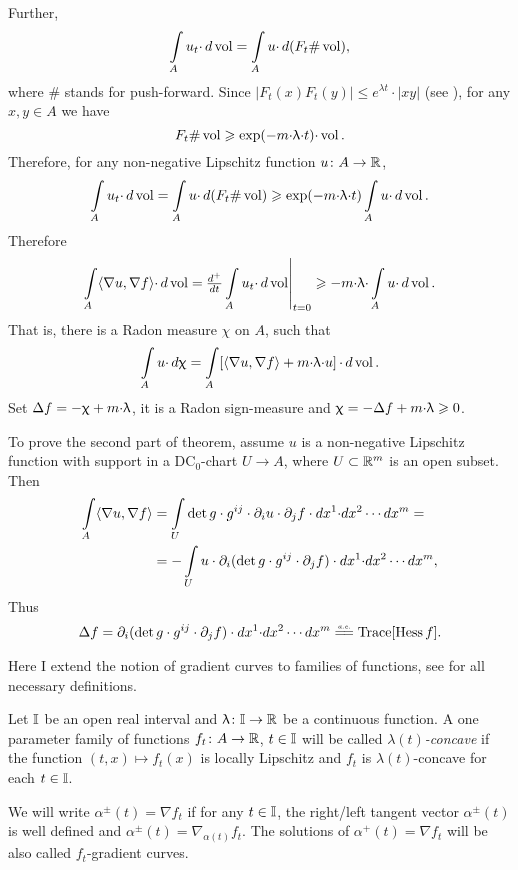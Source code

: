 \documentclass[oneside,a4paper]{article}
\begin{document}
Further,
$$\int\limits_A u_t{\cdot} \,d\mathop{\rm vol}\nolimits=\int\limits_A u{\cdot} \,d(F_t\#\mathop{\rm vol}\nolimits),$$ 
where $\#$ stands for push-forward. 
Since $|F_t(x)F_t(y)|\le e^{\lambda t}{\cdot}|x y|$  
(see \cite[2.1.4(i)]{petrunin:survey}), 
for any $x,y\in A$ we have
$$F_t\#\mathop{\rm vol}\nolimits\geqslant \exp(-m{\cdot}\uplambda{\cdot} t){\cdot}\mathop{\rm vol}\nolimits.$$
Therefore, for any non-negative Lipschitz function $u\colon A\to\mathbb{R}$,
$$\int\limits_A u_t{\cdot}\,d\mathop{\rm vol}\nolimits
=
\int\limits_A u{\cdot}\,d (F_t\#\mathop{\rm vol}\nolimits)
\geqslant
\exp(-m{\cdot}\uplambda{\cdot} t)\int\limits_A u{\cdot}\,d\mathop{\rm vol}\nolimits.$$
Therefore
$$\int\limits_A\langle\nabla u,\nabla f\rangle{\cdot}\,d\mathop{\rm vol}\nolimits 
=
\!\left.\tfrac{d^+}{d t}\int\limits_A u_t{\cdot}\,d\mathop{\rm vol}\nolimits\right|_{t=0}
\geqslant
-m{\cdot}\uplambda{\cdot}\int\limits_A u{\cdot}\,d\mathop{\rm vol}\nolimits.$$
That is, there is a Radon measure $\chi$ on $A$, such that
$$\int\limits_A u{\cdot}\,d\upchi
=
\int\limits_A\!\left[\langle\nabla u,\nabla f\rangle+m{\cdot}\uplambda{\cdot} u\right]{\cdot}\,d\mathop{\rm vol}\nolimits.$$
Set $\Delta f=-\upchi+m{\cdot}\uplambda$, 
it is a Radon sign-measure and $\upchi=-\Delta f+m{\cdot}\uplambda\geqslant 0$.

To prove the second part of theorem,
assume $u$ is a non-negative Lipschitz function with support in a DC$_0$-chart $U\to A$,
where $U\subset \mathbb{R}^m$ is an open subset.
Then 
\begin{align*}
\int\limits_A\langle\nabla u,\nabla f\rangle
&=
\int\limits_U \det g\cdot g^{i j}\cdot\partial_i u\cdot\partial_j f \cdot 
d x^1{\cdot}d x^2\cdots d x^m
=
\\
&=-\int\limits_U u\cdot\partial_i(\det g\cdot g^{i j}\cdot\partial_j f) \cdot d x^1{\cdot}d x^2\cdots d x^m,
\end{align*}
Thus 
$$\Lap f
=
\partial_i(\det g\cdot g^{i j}\cdot\partial_j f)\cdot d x^1{\cdot}d x^2\cdots d x^m
\ae \Trace[\Hess f].$$
\qedsf

 Here I extend the notion of gradient curves to  families of functions, see \cite{petrunin:survey} for all necessary definitions.

Let $\mathbb{I}$ be an open real interval
and $\uplambda\colon\mathbb{I}\to\mathbb{R}$ be a continuous function.
A one parameter family of functions $f_t\colon A\to \mathbb{R}$, $t\in \mathbb{I}$ will be called \emph{$\lambda(t)$-concave} if the function $(t,x)\mapsto f_t(x)$ is locally Lipschitz 
and $f_t$ is $\lambda(t)$-concave for each $t\in \mathbb{I}$.

We will write 
$\alpha^\pm(t)=\nabla f_t$
if for any $t\in \mathbb{I}$, the right/left tangent vector $\alpha^\pm(t)$
is well defined and $\alpha^\pm(t)=\nabla_{\alpha(t)}f_t$.
The solutions of $\alpha^+(t)=\nabla f_t$ will be also called $f_t$-gradient curves.
\end{document}
